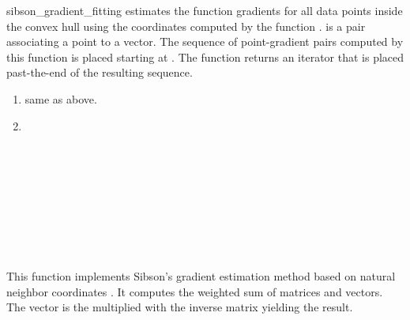 \begin{ccRefFunction}{sibson_gradient_fitting}
 {estimates
  the function gradients for all data points inside the convex hull
  using the coordinates computed by the function
  .
   is a pair associating a point to a
  vector. The sequence of point-gradient pairs computed by this
  function is placed starting at . The function returns an
  iterator that is placed past-the-end of the resulting sequence.}
\begin{enumerate}
  \item same as above.
  \item 
\end{enumerate}

\ccSeeAlso
{} \\
 \\
 \\
 \\
 \\
\\
 \\
\\

\ccImplementation This function implements Sibson's gradient
estimation method based on natural neighbor coordinates
\cite{s-bdnni-81}. It computes the weighted sum of matrices and
vectors. The vector is the multiplied with the inverse matrix yielding
the result.


\end{ccRefFunction}


